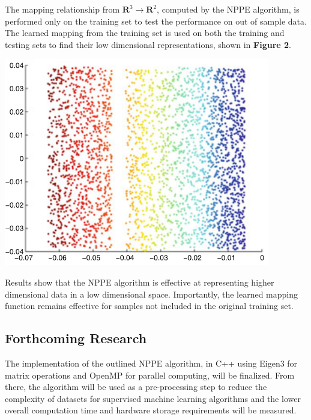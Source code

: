 \documentclass[a0,landscape]{a0poster}
\begin{document}
\begin{multicols}{4}
The mapping relationship from $\mathbf{R}^3 \rightarrow \mathbf{R}^2$, computed by the NPPE algorithm, is performed only on the training set to test the performance on out of sample data. The learned mapping from the training set is used on both the training and testing sets to find their low dimensional representations, shown in \textbf{Figure 2}.
\begin{center}\vspace{1cm}
\includegraphics[width=0.8\linewidth]{figures/ld.png}
\end{center}\vspace{1cm}
 \par Results show that the NPPE algorithm is effective at representing higher dimensional data in a low dimensional space. Importantly, the learned mapping function remains effective for samples not included in the original training set. 
 

\begin{tcolorbox}[colback=white,colframe=black]
    \color{DarkSlateGray}
    \begin{center}\section*{Forthcoming Research}\end{center}
\end{tcolorbox}
\color{Black}
The implementation of the outlined NPPE algorithm, in C++ using Eigen3 for matrix operations and OpenMP for parallel computing, will be finalized. From there, the algorithm will be used as a pre-processing step to reduce the complexity of datasets for supervised machine learning algorithms and the lower overall computation time and hardware storage requirements will be measured. 
\vspace{0.5cm}


\end{multicols}
\end{document}

